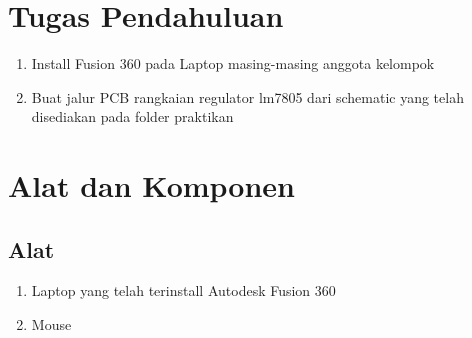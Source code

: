 \section{Tugas Pendahuluan}
\begin{enumerate}
    \item Install Fusion 360 pada Laptop masing-masing anggota kelompok
    \item Buat jalur PCB rangkaian regulator lm7805 dari schematic yang telah disediakan pada folder praktikan
\end{enumerate}

\section{Alat dan Komponen}
\subsection{Alat}
\begin{enumerate}
    \item Laptop yang telah terinstall Autodesk Fusion 360
    \item Mouse
\end{enumerate}

